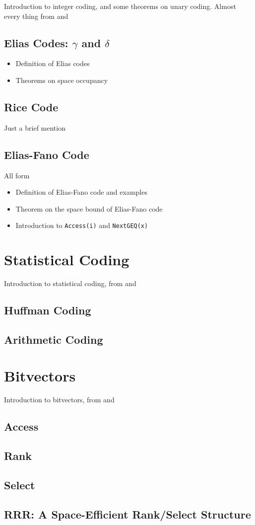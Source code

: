 Introduction to integer coding, and some theorems on unary coding. Almost every thing from \cite{ferragina2023pearls} and \cite{han2002mathematics}

\subsection{Elias Codes: $\gamma$ and $\delta$}
\begin{itemize}
    \item Definition of Elias codes
    \item Theorems on space occupancy
\end{itemize}

\subsection{Rice Code}
Just a brief mention
\subsection{Elias-Fano Code}
All form \cite{ferragina2023pearls,sayood2002lossless}
\begin{itemize}
    \item Definition of Elias-Fano code and examples
    \item Theorem on the space bound of Elias-Fano code
    \item Introduction to \texttt{Access(i)} and \texttt{NextGEQ(x)}
\end{itemize}

\section{Statistical Coding}

Introduction to statistical coding, from \cite{han2002mathematics} and \cite{ferragina2023pearls}

\subsection{Huffman Coding}

\subsection{Arithmetic Coding}

\section{Bitvectors}

Introduction to bitvectors, from \cite{ferragina2023pearls} and \cite{navarro2016compact}

\subsection{Access}
\subsection{Rank}
\subsection{Select}
\subsection{RRR: A Space-Efficient Rank/Select Structure}
